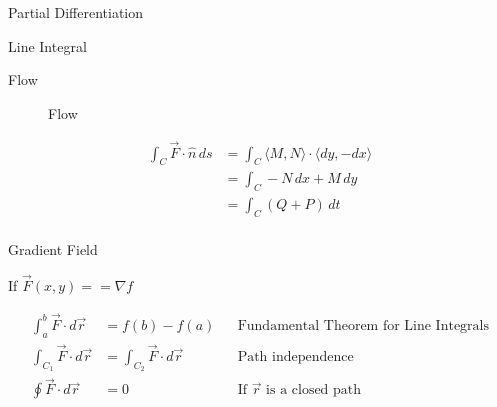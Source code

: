 \begin{section}{Partial Differentiation}
\begin{section}{Line Integral}
\begin{subsection}{Flow}
\begin{figure}[H]
\begin{center}
          \caption{Flow}
        \end{center}
      \end{figure}
      \begin{align*}
        \int_C \vec{F}\cdot\hat{n}\,ds
                                      &= \int_C \langle M,N \rangle \cdot \langle dy,-dx \rangle \\
                                      &= \int_C -N\,dx + M\,dy \\
                                      &= \int_C (Q + P) \,dt \\
      \end{align*}
    \end{subsection} %
  \end{section}

  \begin{section}{Gradient Field}

    If $\vec{F}(x,y) == \nabla{f}$

    \begin{align*}
      \int_a^b \vec{F} \cdot d\vec{r} &= f(b) - f(a) &&
      \text{Fundamental Theorem for Line Integrals}\\
      \int_{C_1} \vec{F} \cdot d\vec{r} &= \int_{C_2} \vec{F} \cdot d\vec{r} &&
      \text{Path independence}\\
      \oint \vec{F} \cdot d\vec{r} &= 0 &&
      \text{If $\vec{r}$ is a closed path}\\
    \end{align*}
  \end{section}



\end{section}

